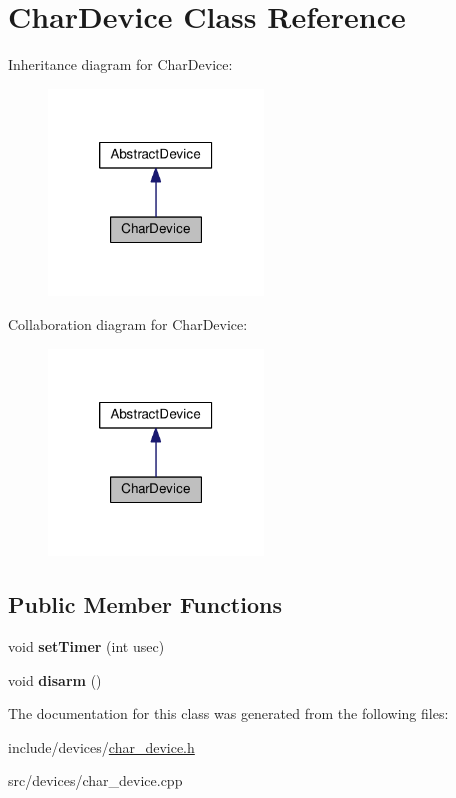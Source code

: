 \hypertarget{classCharDevice}{\section{\-Char\-Device \-Class \-Reference}
\label{d8/d4f/classCharDevice}
}


\-Inheritance diagram for \-Char\-Device\-:\nopagebreak
\begin{figure}[H]
\begin{center}
\leavevmode
\includegraphics[width=162pt]{da/d98/classCharDevice__inherit__graph}
\end{center}
\end{figure}


\-Collaboration diagram for \-Char\-Device\-:\nopagebreak
\begin{figure}[H]
\begin{center}
\leavevmode
\includegraphics[width=162pt]{d2/db9/classCharDevice__coll__graph}
\end{center}
\end{figure}
\subsection*{\-Public \-Member \-Functions}
\begin{DoxyCompactItemize}
\item 
\hypertarget{classCharDevice_a8689c0a03b971367322a9dd25bcfb7db}{void {\bfseries set\-Timer} (int usec)}\label{d8/d4f/classCharDevice_a8689c0a03b971367322a9dd25bcfb7db}

\item 
\hypertarget{classCharDevice_ac9d8bccbe98ee7e4f87d412694fb7cf3}{void {\bfseries disarm} ()}\label{d8/d4f/classCharDevice_ac9d8bccbe98ee7e4f87d412694fb7cf3}

\end{DoxyCompactItemize}


\-The documentation for this class was generated from the following files\-:\begin{DoxyCompactItemize}
\item 
include/devices/\hyperlink{char__device_8h}{char\-\_\-device.\-h}\item 
src/devices/char\-\_\-device.\-cpp\end{DoxyCompactItemize}
